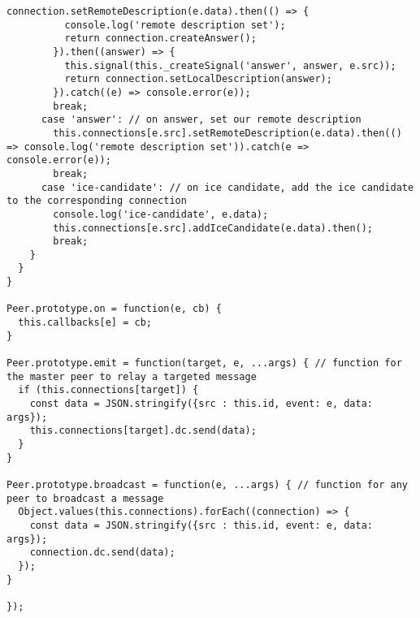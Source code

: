 \begin{singlespace}
\begin{lstlisting}[]
        connection.setRemoteDescription(e.data).then(() => {
          console.log('remote description set');
          return connection.createAnswer();
        }).then((answer) => {
          this.signal(this._createSignal('answer', answer, e.src));
          return connection.setLocalDescription(answer);
        }).catch((e) => console.error(e));
        break;
      case 'answer': // on answer, set our remote description
        this.connections[e.src].setRemoteDescription(e.data).then(() => console.log('remote description set')).catch(e => console.error(e));
        break;
      case 'ice-candidate': // on ice candidate, add the ice candidate to the corresponding connection
        console.log('ice-candidate', e.data);
        this.connections[e.src].addIceCandidate(e.data).then();
        break;
    }
  }
}

Peer.prototype.on = function(e, cb) {
  this.callbacks[e] = cb;
}

Peer.prototype.emit = function(target, e, ...args) { // function for the master peer to relay a targeted message
  if (this.connections[target]) {
    const data = JSON.stringify({src : this.id, event: e, data: args});
    this.connections[target].dc.send(data);
  }
}

Peer.prototype.broadcast = function(e, ...args) { // function for any peer to broadcast a message
  Object.values(this.connections).forEach((connection) => {
    const data = JSON.stringify({src : this.id, event: e, data: args});
    connection.dc.send(data);
  });
}

});
\end{lstlisting}
\end{singlespace}

